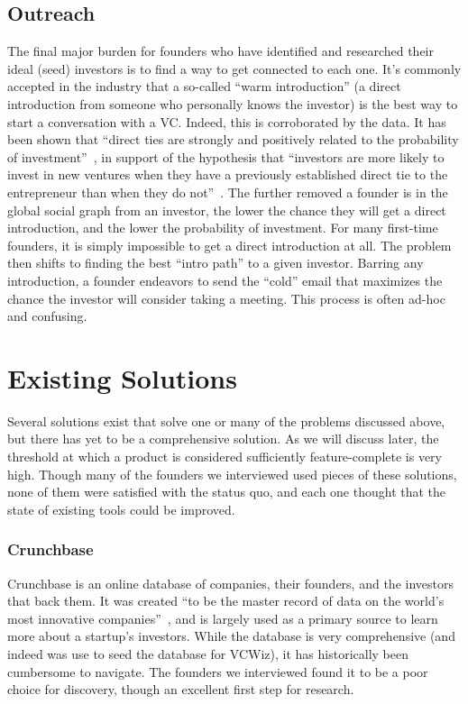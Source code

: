 \subsection{Outreach}

The final major burden for founders who have identified and researched their ideal (seed) investors is to find a way to get connected to each one. It's commonly accepted in the industry that a so-called ``warm introduction'' (a direct introduction from someone who personally knows the investor) is the best way to start a conversation with a VC. Indeed, this is corroborated by the data. It has been shown that ``direct ties are strongly and positively related to the probability of investment''~\cite{doi:10.1287/mnsc.48.3.364.7731}, in support of the hypothesis that ``investors are more likely to invest in new ventures when they have a previously established direct tie to the entrepreneur than when they do not''~\cite{doi:10.1287/mnsc.48.3.364.7731}. The further removed a founder is in the global social graph from an investor, the lower the chance they will get a direct introduction, and the lower the probability of investment. For many first-time founders, it is simply impossible to get a direct introduction at all. The problem then shifts to finding the best ``intro path'' to a given investor. Barring any introduction, a founder endeavors to send the ``cold'' email that maximizes the chance the investor will consider taking a meeting. This process is often ad-hoc and confusing.

\section{Existing Solutions}
\label{vcwiz:existing}

Several solutions exist that solve one or many of the problems discussed above, but there has yet to be a comprehensive solution. As we will discuss later, the threshold at which a product is considered sufficiently feature-complete is very high. Though many of the founders we interviewed used pieces of these solutions, none of them were satisfied with the status quo, and each one thought that the state of existing tools could be improved.

\subsubsection{Crunchbase}

Crunchbase is an online database of companies, their founders, and the investors that back them. It was created ``to be the master record of data on the world's most innovative companies''~\cite{doi:10.1287/mnsc.48.3.364.7731}, and is largely used as a primary source to learn more about a startup's investors. While the database is very comprehensive (and indeed was use to seed the database for VCWiz), it has historically been cumbersome to navigate. The founders we interviewed found it to be a poor choice for discovery, though an excellent first step for research.

